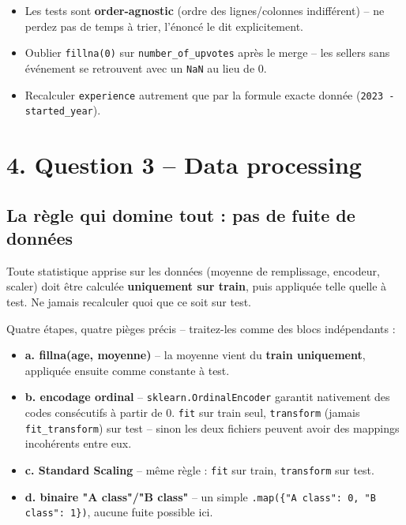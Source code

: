 \documentclass[11pt]{article}
\newcommand{\exhead}[1]{\subsection{#1}}
\begin{document}
\begin{trap}
\begin{itemize}[nosep]
  \item Les tests sont \textbf{order-agnostic} (ordre des lignes/colonnes
        indiff\'erent) -- ne perdez pas de temps \`a trier, l'\'enonc\'e le
        dit explicitement.
  \item Oublier \texttt{fillna(0)} sur \texttt{number\_of\_upvotes} apr\`es
        le merge -- les sellers sans \'ev\'enement se retrouvent avec
        un \texttt{NaN} au lieu de 0.
  \item Recalculer \texttt{experience} autrement que par la formule
        exacte donn\'ee (\texttt{2023 - started\_year}).
\end{itemize}
\end{trap}

\section{4. Question 3 -- Data processing}

\exhead{La r\`egle qui domine tout : pas de fuite de donn\'ees}
Toute statistique apprise sur les donn\'ees (moyenne de remplissage,
encodeur, scaler) doit \^etre calcul\'ee \textbf{uniquement sur train},
puis appliqu\'ee telle quelle \`a test. Ne jamais recalculer quoi que ce
soit sur test.

\begin{explik}
Quatre \'etapes, quatre pi\`eges pr\'ecis -- traitez-les comme des blocs
ind\'ependants :
\begin{itemize}[nosep]
  \item \textbf{a. fillna(age, moyenne)} -- la moyenne vient du
        \textbf{train uniquement}, appliqu\'ee ensuite comme constante \`a
        test.
  \item \textbf{b. encodage ordinal} -- \texttt{sklearn.OrdinalEncoder}
        garantit nativement des codes cons\'ecutifs \`a partir de 0.
        \texttt{fit} sur train seul, \texttt{transform} (jamais
        \texttt{fit\_transform}) sur test -- sinon les deux fichiers
        peuvent avoir des mappings incoh\'erents entre eux.
  \item \textbf{c. Standard Scaling} -- m\^eme r\`egle : \texttt{fit} sur
        train, \texttt{transform} sur test.
  \item \textbf{d. binaire "A class"/"B class"} -- un simple
        \texttt{.map(\{"A class": 0, "B class": 1\})}, aucune fuite
        possible ici.
\end{itemize}
\end{explik}
\end{document}
